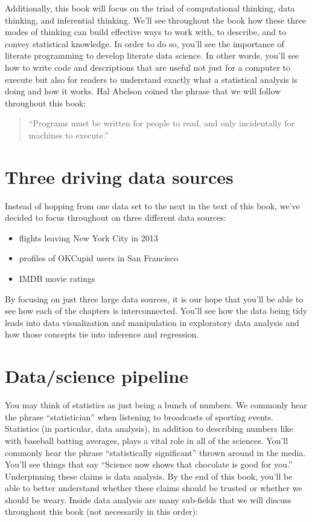 \documentclass[]{tufte-book}
\providecommand{\tightlist}{%
  \setlength{\itemsep}{0pt}\setlength{\parskip}{0pt}}
\begin{document}
Additionally, this book will focus on the triad of computational
thinking, data thinking, and inferential thinking. We'll see throughout
the book how these three modes of thinking can build effective ways to
work with, to describe, and to convey statistical knowledge. In order to
do so, you'll see the importance of literate programming to develop
literate data science. In other words, you'll see how to write code and
descriptions that are useful not just for a computer to execute but also
for readers to understand exactly what a statistical analysis is doing
and how it works. Hal Abelson coined the phrase that we will follow
throughout this book:

\begin{quote}
``Programs must be written for people to read, and only incidentally for
machines to execute.''
\end{quote}

\section{Three driving data sources}\label{three-driving-data-sources}

Instead of hopping from one data set to the next in the text of this
book, we've decided to focus throughout on three different data sources:

\begin{itemize}
\tightlist
\item
  flights leaving New York City in 2013
\item
  profiles of OKCupid users in San Francisco
\item
  IMDB movie ratings
\end{itemize}

By focusing on just three large data sources, it is our hope that you'll
be able to see how each of the chapters is interconnected. You'll see
how the data being tidy leads into data visualization and manipulation
in exploratory data analysis and how those concepts tie into inference
and regression.

\section{Data/science pipeline}\label{datascience-pipeline}

You may think of statistics as just being a bunch of numbers. We
commonly hear the phrase ``statistician'' when listening to broadcasts
of sporting events. Statistics (in particular, data analysis), in
addition to describing numbers like with baseball batting averages,
plays a vital role in all of the sciences. You'll commonly hear the
phrase ``statistically significant'' thrown around in the media. You'll
see things that say ``Science now shows that chocolate is good for
you.'' Underpinning these claims is data analysis. By the end of this
book, you'll be able to better understand whether these claims should be
trusted or whether we should be weary. Inside data analysis are many
sub-fields that we will discuss throughout this book (not necessarily in
this order):
\end{document}
